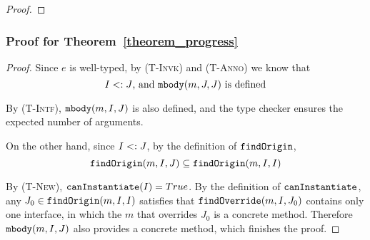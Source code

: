 \begin{proof}
\begin{comment}
\noindent \textbf{Case Super-Invk.}
let \[ e = \kwsuper.K::m(\overline{\angl{I_e}} \overline{e}) \]   
Suppose \[ \mbody(m, K, K) = (J', \overline{I_x} \; \overline{x}, I_{e_0} \; e_0) \] 
then \[ e' =  [\overline{\angl{I_x}} \overline{e}/\overline{x}] e_0 \] 
By rules \textsc{(T-New)} and \textsc{(T-Invk)}, 
  \[ 
     \mtype(m, K, K) = \overline{I_x} \rightarrow I_{e_0} \quad 
     \judgeewf \Gamma {\overline{e} : \overline{I_e'}} \quad
     \overline{I_e'} \subtype \overline{I_x} \quad
     \textit{, for some } \; \overline{I_e'}
  \]
By Lemma~\ref{lemma0},
    \[
    \judgeewf {\Gamma, \overline{x}:\overline{I_x}, \kwthis:J_0} {e_0:I_f} \textit{, for some } K \subtype J_0 \textit{ and } I_f \subtype I_{e_0}
    \]
By Lemma~\ref{lemma1},
    \[
    \judgeewf {\Gamma} {[\overline{\angl{I_x}} \overline{e}/\overline{x} ] e_0  :  I_g} \textit{, for some } I_g \subtype I_f 
    \]
So $I_g <: I_{e_0}$, finally just let $I' = I_g$.

\end{comment}
\end{proof}

\subsubsection{Proof for Theorem~\ref{theorem_progress}}
\begin{proof}
Since $e$ is well-typed, by \textsc{(T-Invk)} and \textsc{(T-Anno)} we know that
$$I <: J\textrm{, and }\texttt{mbody}(m, J, J) \textrm{ is defined}$$

By \textsc{(T-Intf)}, $\texttt{mbody}(m, I, J)$ is also defined, and the type checker ensures the expected number of arguments.

On the other hand, since $I <: J$, by the definition of $\texttt{findOrigin}$, $$\texttt{findOrigin}(m, I, J) \subseteq \texttt{findOrigin}(m, I, I)$$

By \textsc{(T-New)}, $\texttt{canInstantiate}(I) = True$. By the definition of $\texttt{canInstantiate}$, any $J_0\in\texttt{findOrigin}(m, I, I)$ satisfies that
$\texttt{findOverride}(m, I, J_0)$ contains only one interface, in which the $m$ that overrides $J_0$ is a concrete method. Therefore $\texttt{mbody}(m, I, J)$ also provides a concrete method, which finishes the proof.
\end{proof}

